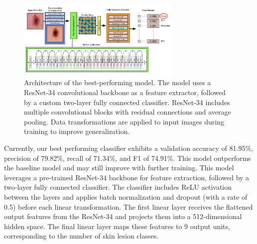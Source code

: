 \documentclass{article} %
\begin{document}
\begin{figure}[h]
\begin{center}
\includegraphics[width=0.7\textwidth]{Figs/model_architecture.png}
\end{center}
\caption{Architecture of the best-performing model. The model uses a ResNet-34 convolutional backbone as a feature extractor, followed by a custom two-layer fully connected classifier. ResNet-34 includes multiple convolutional blocks with residual connections and average pooling. Data transformations are applied to input images during training to improve generalization.}
\end{figure}

Currently, our best performing classifier exhibits a validation accuracy of 81.95\%, precision of 79.82\%, recall of 71.34\%, and F1 of 74.91\%. This model outperforms the baseline model and may still improve with further training. This model leverages a pre-trained ResNet-34 backbone for feature extraction, followed by a two-layer fully connected classifier. The classifier includes ReLU activation between the layers and applies batch normalization and dropout (with a rate of 0.5) before each linear transformation. The first linear layer receives the flattened output features from the ResNet-34 and projects them into a 512-dimensional hidden space. The final linear layer maps these features to 9 output units, corresponding to the number of skin lesion classes.
\end{document}
